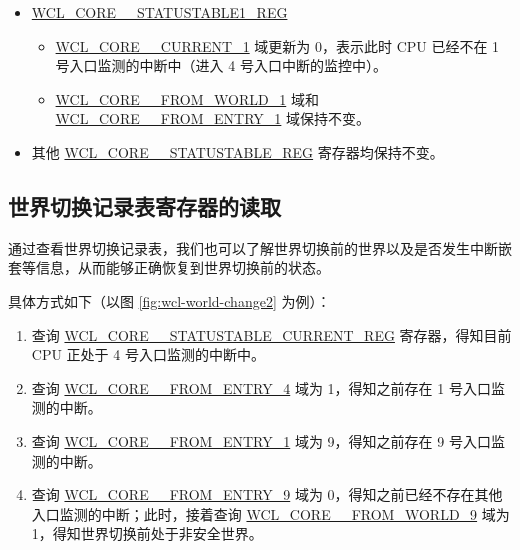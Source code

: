 \documentclass[main\_\_CN.tex]{subfiles}
\begin{document}
\begin{enumerate}
\begin{itemize}
        \begin{itemize}
            \item \hyperref[fielddesc:WCLCORE0FROMWORLDn]{WCL\_CORE\_\_FROM\_WORLD\_4} 域为 0，表示 CPU 在切换之前处于安全世界。
            \item \hyperref[fielddesc:WCLCORE0FROMENTRYn]{WCL\_CORE\_\_FROM\_ENTRY\_4} 域为 1，表示切换之前处于 1 号入口监测的中断。
            \item \hyperref[fielddesc:WCLCORE0CURRENTn]{WCL\_CORE\_\_CURRENT\_4} 域更新为 1，表示此时 CPU 正在 4 号入口监测的中断中。
        \end{itemize}
        \item \hyperref[regdesc:WCLCORE0STATUSTABLEnREG]{WCL\_CORE\_\_STATUSTABLE1\_REG}
        \begin{itemize}
            \item \hyperref[fielddesc:WCLCORE0CURRENTn]{WCL\_CORE\_\_CURRENT\_1} 域更新为 0，表示此时 CPU 已经不在 1 号入口监测的中断中（进入 4 号入口中断的监控中）。
            \item \hyperref[fielddesc:WCLCORE0FROMWORLDn]{WCL\_CORE\_\_FROM\_WORLD\_1} 域和 \hyperref[fielddesc:WCLCORE0FROMENTRYn]{WCL\_CORE\_\_FROM\_ENTRY\_1} 域保持不变。
        \end{itemize}
        \item 其他 \hyperref[regdesc:WCLCORE0STATUSTABLEnREG]{WCL\_CORE\_\_STATUSTABLE\_REG} 寄存器均保持不变。
\end{itemize}
\end{enumerate}

\subsection{世界切换记录表寄存器的读取} \label{sec:wctrl-read-table}

通过查看世界切换记录表，我们也可以了解世界切换前的世界以及是否发生中断嵌套等信息，从而能够正确恢复到世界切换前的状态。

具体方式如下（以图 \ref{fig:wcl-world-change2} 为例）：
\begin{enumerate}
    \item 查询 \hyperref[regdesc:WCLCORE0STATUSTABLECURRENTREG]{WCL\_CORE\_\_STATUSTABLE\_CURRENT\_REG} 寄存器，得知目前 CPU 正处于 4 号入口监测的中断中。
    \item 查询 \hyperref[fielddesc:WCLCORE0FROMENTRYn]{WCL\_CORE\_\_FROM\_ENTRY\_4} 域为 1，得知之前存在 1 号入口监测的中断。
    \item 查询 \hyperref[fielddesc:WCLCORE0FROMENTRYn]{WCL\_CORE\_\_FROM\_ENTRY\_1} 域为 9，得知之前存在 9 号入口监测的中断。
    \item 查询 \hyperref[fielddesc:WCLCORE0FROMENTRYn]{WCL\_CORE\_\_FROM\_ENTRY\_9} 域为 0，得知之前已经不存在其他入口监测的中断；此时，接着查询 \hyperref[fielddesc:WCLCORE0FROMWORLDn]{WCL\_CORE\_\_FROM\_WORLD\_9} 域为 1，得知世界切换前处于非安全世界。
\end{enumerate}
\end{document}
